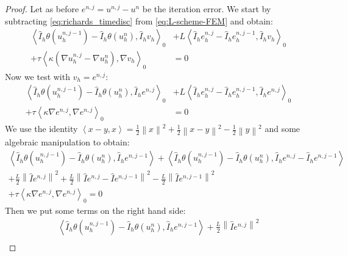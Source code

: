 \documentclass[../Main/main.tex]{subfiles}
\begin{document}
	\begin{proof}
		Let as before $e^{n,j} = u^{n,j}-u^n$ be the iteration error.
		We start by subtracting \eqref{eq:richards_timedisc} from \eqref{eq:L-scheme-FEM} and obtain:
			\begin{equation}
			\begin{aligned}
				\left \langle \hat{I}_h \theta(u^{n,j-1}_h) - \hat{I}_h \theta(u^{n}_h),\hat{I}_h v_h \right \rangle_0 &+ L \left \langle \hat{I}_h e^{n,j}_h -  \hat{I}_h e^{n,j-1}_h,\hat{I}_h v_h \right \rangle_0 \\+ \tau \left \langle \kappa (\nabla u^{n,j}_h-\nabla u^{n}_h),\nabla v_h \right \rangle_0 &=0 
			\end{aligned}
		\end{equation}
		Now we test with $v_h=e^{n,j}$:
		\begin{equation}
			\begin{aligned}
				\left \langle \hat{I}_h \theta(u^{n,j-1}_h) - \hat{I}_h \theta(u^{n}_h),\hat{I}_h e^{n,j} \right \rangle_0 &+ L \left \langle \hat{I}_h e^{n,j}_h -  \hat{I}_h e^{n,j-1}_h,\hat{I}_h e^{n,j} \right \rangle_0 \\+ \tau \left \langle \kappa\nabla e^{n,j},\nabla e^{n,j} \right \rangle_0 &=0 
			\end{aligned}
		\end{equation}
		We use the identity $\left \langle x-y,x\right \rangle = \frac{1}{2}\left \| x \right \|^2 + \frac{1}{2}\left \| x-y \right \|^2 - \frac{1}{2} \left \| y \right \|^2$ and some algebraic manipulation to obtain:
		\begin{equation}
			\begin{gathered}
					\left \langle \hat{I}_h \theta(u^{n,j-1}_h) - \hat{I}_h \theta(u^{n}_h),\hat{I}_h e^{n,j-1} \right \rangle + 	\left \langle \hat{I}_h \theta(u^{n,j-1}_h) - \hat{I}_h \theta(u^{n}_h),\hat{I}_h e^{n,j} - \hat{I}_h e^{n,j-1}\right \rangle \\
					+\frac{L}{2}\left \| \hat{I} e^{n,j}\right \|^2 + \frac{L}{2}\left \| \hat{I} e^{n,j}-\hat{I}e^{n,j-1} \right \|^2 -\frac{L}{2}\left \| \hat{I} e^{n,j-1}\right \|^2 \\
				+ \tau \left \langle \kappa \nabla e^{n,j},\nabla e^{n,j} \right \rangle_0 =0 
			\end{gathered}
		\end{equation}
		Then we put some terms on the right hand side:
		\begin{equation}
			\begin{gathered}
				\left \langle \hat{I}_h \theta(u^{n,j-1}_h) - \hat{I}_h \theta(u^{n}_h),\hat{I}_h e^{n,j-1} \right \rangle +\frac{L}{2}\left \| \hat{I} e^{n,j}\right \|^2 	 \\

\end{gathered}
\end{equation}
\end{proof}
\end{document}
